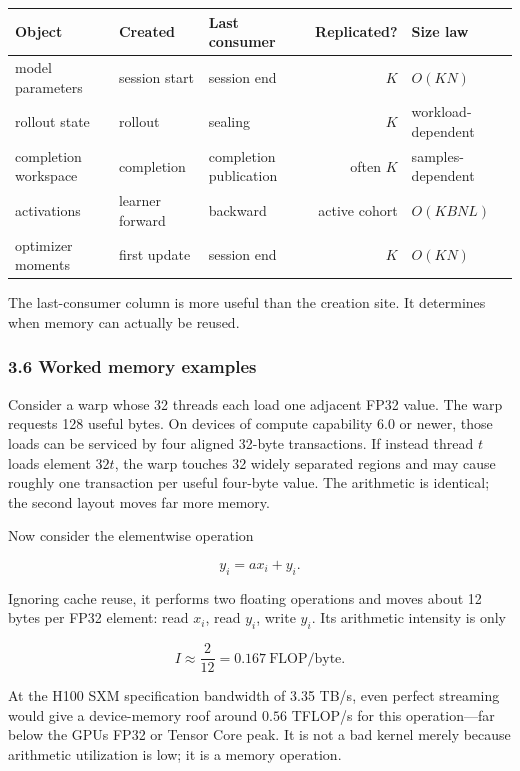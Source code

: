 \documentclass[
  10pt,
  letterpaper,
]{article}
\newcounter{none} %
\begin{document}
{\def\LTcaptype{none} %
\begin{longtable}[]{@{}lllrl@{}}
\toprule\noalign{}
Object & Created & Last consumer & Replicated? & Size law \\
\midrule\noalign{}
\endhead
\bottomrule\noalign{}
\endlastfoot
model parameters & session start & session end & \(K\) & \(O(KN)\) \\
rollout state & rollout & sealing & \(K\) & workload-dependent \\
completion workspace & completion & completion publication & often \(K\)
& samples-dependent \\
activations & learner forward & backward & active cohort &
\(O(KBNL)\) \\
optimizer moments & first update & session end & \(K\) & \(O(KN)\) \\
\end{longtable}
}

The last-consumer column is more useful than the creation site. It
determines when memory can actually be reused.

\subsubsection{3.6 Worked memory
examples}\label{36-worked-memory-examples}

Consider a warp whose 32 threads each load one adjacent FP32 value. The
warp requests 128 useful bytes. On devices of compute capability 6.0 or
newer, those loads can be serviced by four aligned 32-byte transactions.
If instead thread \(t\) loads element \(32t\), the warp touches 32
widely separated regions and may cause roughly one transaction per
useful four-byte value. The arithmetic is identical; the second layout
moves far more memory.

Now consider the elementwise operation

\[
y_i=ax_i+y_i.
\]

Ignoring cache reuse, it performs two floating operations and moves
about 12 bytes per FP32 element: read \(x_i\), read \(y_i\), write
\(y_i\). Its arithmetic intensity is only

\[
I\approx\frac{2}{12}=0.167\ \text{FLOP/byte}.
\]

At the H100 SXM specification bandwidth of 3.35 TB/s, even perfect
streaming would give a device-memory roof around \(0.56\) TFLOP/s for
this operation---far below the GPU\textquotesingle s FP32 or Tensor Core
peak. It is not a bad kernel merely because arithmetic utilization is
low; it is a memory operation.
\end{document}
